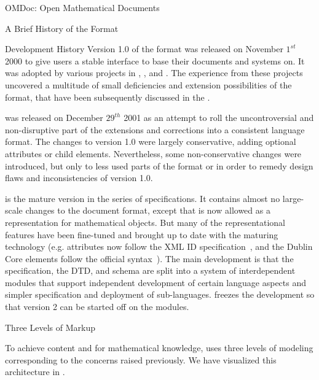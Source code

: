 \begin{tchapter}[id=omdoc-markup,short=Open Mathematical Documents]{OMDoc: Open Mathematical Documents}
\begin{tsection}[id=omdoc-history]{A Brief History of the {\omdoc} Format}
  \begin{tsubsection}{Development History} 
    Version 1.0 of the {\omdoc} format was released on November $1^{st}$ 2000 to give
    users a stable interface to base their documents and systems on. It was adopted by
    various projects in {},
    {}, and
    {}. The experience from these projects
    uncovered a multitude of small deficiencies and extension possibilities of the format,
    that have been subsequently discussed in the {\omdoc} {}.

    {} was released on December $29^{th}$ 2001 as an attempt to roll the
    uncontroversial and non-disruptive part of the extensions and corrections into a
    consistent language format. The changes to version 1.0 were largely conservative,
    adding optional attributes or child elements. Nevertheless, some non-conservative
    changes were introduced, but only to less used parts of the format or in order to
    remedy design flaws and inconsistencies of version 1.0.

    {} is the mature version in the {} series of specifications. It
    contains almost no large-scale changes to the document format, except that {\cmathml}
    is now allowed as a representation for mathematical objects. But many of the
    representational features have been fine-tuned and brought up to date with the
    maturing {\xml} technology (e.g. {} attributes now follow
    the XML ID specification~\cite{XML:id05}, and the Dublin Core elements follow the
    official syntax~\cite{DCMI:dmt03}). The main development is that the {\omdoc}
    specification, the DTD, and schema are split into a system of interdependent modules
    that support independent development of certain language aspects and simpler
    specification and deployment of sub-languages.  {} freezes the development
    so that version 2 can be started off on the modules.
  \end{tsubsection}
\end{tsection}

\begin{tsection}[id=three-level-markup]{Three Levels of Markup}

  To achieve content and {} for
  mathematical knowledge, {\omdoc} uses three levels of modeling corresponding to the
  concerns raised previously. We have visualized this architecture in
  {}.


\end{tsection}
\end{tchapter}
